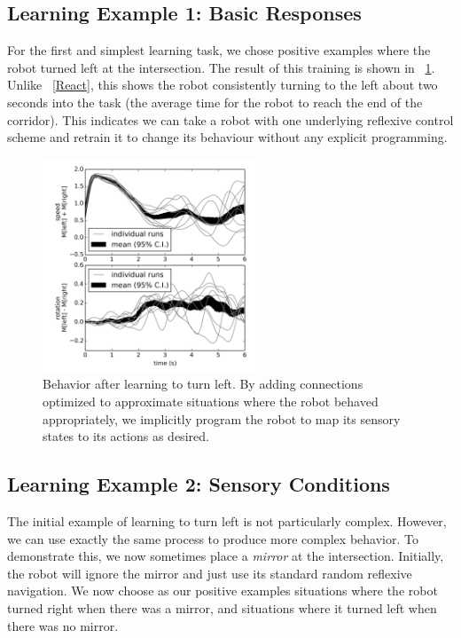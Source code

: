 \documentclass[conference]{IEEEtran}
\begin{document}
\subsection{Learning Example 1: Basic Responses}

For the first and simplest learning task, we chose positive examples
where the robot turned left at the intersection.
The result of this training is shown in \figurename~\ref{Left}. Unlike 
\figurename~\ref{React}, this shows the robot consistently turning to the left about 
two seconds into the task (the average time for the robot to reach the end of the corridor).
This indicates we can take a robot with one underlying reflexive control scheme
and retrain it to change its behaviour without any explicit programming.

\begin{figure}[!t]
\centering
\includegraphics[width=2.5in]{learn-left/learnleft.png}
\caption{Behavior after learning to turn left. By adding connections optimized to approximate situations where the robot behaved appropriately, we implicitly program the robot to map its sensory states to its actions as desired.}
\label{Left}
\end{figure}

\subsection{Learning Example 2: Sensory Conditions} \label{learningConditions}

The initial example of learning to turn left is not particularly complex. 
However, we can use exactly the same process to produce more complex behavior.
To demonstrate this, we now sometimes place a \textit{mirror} at the intersection.
Initially, the robot will ignore the mirror and just use its standard random
reflexive navigation.  We now choose as our positive examples situations where
the robot turned right when there was a mirror, and situations where it turned
left when there was no mirror.
\end{document}
